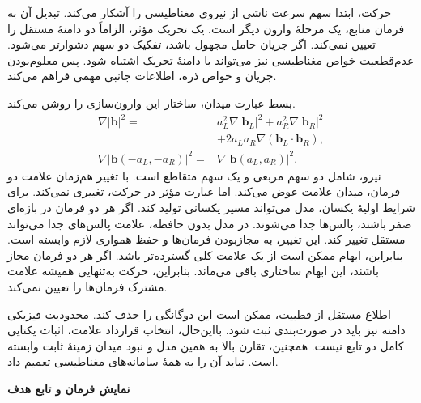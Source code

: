 حرکت، ابتدا سهم سرعت ناشی از نیروی مغناطیسی را آشکار می‌کند.
تبدیل آن به فرمان منابع، یک مرحلهٔ وارون دیگر است.
یک تحریک مؤثر، الزاماً دو دامنهٔ مستقل را تعیین نمی‌کند.
اگر جریان حامل مجهول باشد، تفکیک دو سهم دشوارتر می‌شود.
عدم‌قطعیت خواص مغناطیسی نیز می‌تواند با دامنهٔ تحریک اشتباه شود.
پس معلوم‌بودن جریان و خواص ذره، اطلاعات جانبی مهمی فراهم می‌کند.

بسط عبارت میدان، ساختار این وارون‌سازی را روشن می‌کند.
\begin{equation}
\begin{aligned}
\nabla|\mathbf b|^2={}&
a_L^2\nabla|\mathbf b_L|^2
+a_R^2\nabla|\mathbf b_R|^2\\
&+2a_La_R\nabla(\mathbf b_L\cdot\mathbf b_R),\\
\nabla|\mathbf b(-a_L,-a_R)|^2={}&
\nabla|\mathbf b(a_L,a_R)|^2.
\end{aligned}
\label{eq:lit-magnetic-sign-symmetry}
\end{equation}
نیرو، شامل دو سهم مربعی و یک سهم متقاطع است.
با تغییر هم‌زمان علامت دو فرمان، میدان علامت عوض می‌کند.
اما عبارت مؤثر در حرکت، تغییری نمی‌کند.
برای شرایط اولیهٔ یکسان، مدل می‌تواند مسیر یکسانی تولید کند.
اگر هر دو فرمان در بازه‌ای صفر باشند، پالس‌ها جدا می‌شوند.
در مدل بدون حافظه، علامت پالس‌های جدا می‌تواند مستقل تغییر کند.
این تغییر، به مجازبودن فرمان‌ها و حفظ همواری لازم وابسته است.
بنابراین، ابهام ممکن است از یک علامت کلی گسترده‌تر باشد.
اگر هر دو فرمان مجاز باشند، این ابهام ساختاری باقی می‌ماند.
بنابراین، حرکت به‌تنهایی همیشه علامت مشترک فرمان‌ها را تعیین نمی‌کند.

اطلاع مستقل از قطبیت، ممکن است این دوگانگی را حذف کند.
محدودیت فیزیکی دامنه نیز باید در صورت‌بندی ثبت شود.
بااین‌حال، انتخاب قرارداد علامت، اثبات یکتایی کامل دو تابع نیست.
همچنین، تقارن بالا به همین مدل و نبود میدان زمینهٔ ثابت وابسته است.
نباید آن را به همهٔ سامانه‌های مغناطیسی تعمیم داد.

\textbf{نمایش فرمان و تابع هدف}


